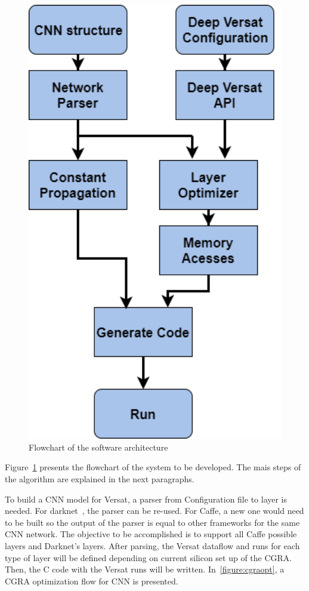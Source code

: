\begin{figure}[!htbp]
    \includegraphics[width=1\textwidth]{Figures/flowchart.png}
    \caption{Flowchart of the software architecture}
    \label{figure:flowchart}
\end{figure}



Figure~\ref{figure:flowchart} presents the flowchart of the system to be developed. The mais steps
of the algorithm are explained in the next paragraphs.

To build a CNN model for Versat, a parser from Configuration file to layer is needed. For darknet~\cite{darknet}, the parser can be re-used.
For Caffe, a new one would need to be built so the output of the parser is equal to other frameworks for the same CNN network.
The objective to be accomplished is to support all Caffe possible layers and Darknet's layers.
After parsing, the Versat dataflow and runs for each type of layer will be defined depending on current silicon set up of the CGRA. Then,
the C code with the Versat runs will be written. In~\ref{figure:cgraopt}, a CGRA optimization flow for CNN is presented.

